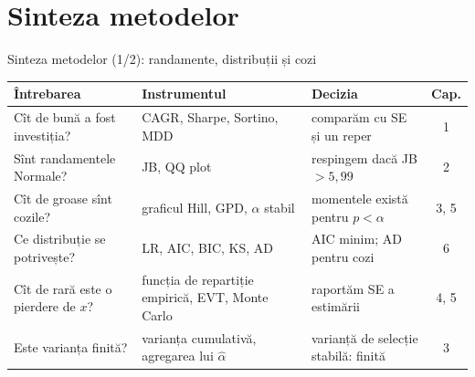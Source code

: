 \section{Sinteza metodelor}

\begin{frame}{Sinteza metodelor (1/2): randamente, distribuții și cozi}
\itemsize{\small}
\begin{center}
\footnotesize
\begin{tabular}{>{\raggedright\arraybackslash}p{3.6cm}>{\raggedright\arraybackslash}p{3.4cm}>{\raggedright\arraybackslash}p{3.4cm}c}
\toprule
\textbf{Întrebarea} & \textbf{Instrumentul} & \textbf{Decizia} & \textbf{Cap.} \\
\midrule
Cît de bună a fost investiția? & CAGR, Sharpe, Sortino, MDD & comparăm cu SE și un reper & 1 \\
Sînt randamentele Normale? & JB, QQ plot & respingem dacă JB $> 5{,}99$ & 2 \\
Cît de groase sînt cozile? & graficul Hill, GPD, $\alpha$ stabil & momentele există pentru $p < \alpha$ & 3, 5 \\
Ce distribuție se potrivește? & LR, AIC, BIC, KS, AD & AIC minim; AD pentru cozi & 6 \\
Cît de rară este o pierdere de $x$? & funcția de repartiție empirică, EVT, Monte Carlo & raportăm SE a estimării & 4, 5 \\
Este varianța finită? & varianța cumulativă, agregarea lui $\hat\alpha$ & varianță de selecție stabilă: finită & 3 \\
\bottomrule
\end{tabular}
\end{center}
\end{frame}

